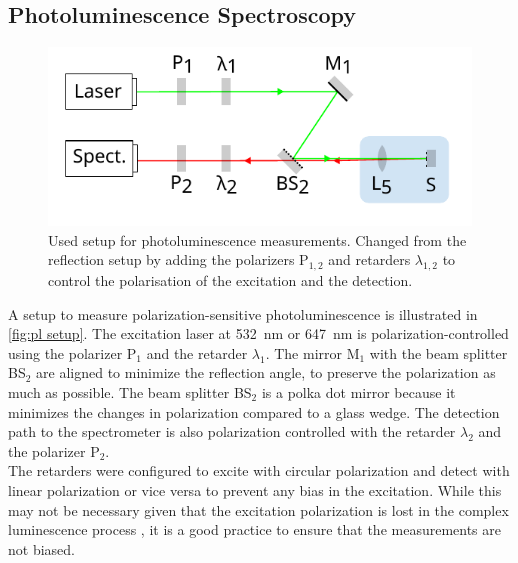 \documentclass[
	twoside,
	parskip=half,
	a4paper,
]{scrbook}
\begin{document}
\subsection{Photoluminescence Spectroscopy}
\begin{figure}
	\centering
	\includegraphics{../figures/setup_simplified.pdf}
	\caption{Used setup for photoluminescence measurements. 
	Changed from the reflection setup by adding the polarizers P$_{1,2}$ and retarders $\lambda_{1,2}$ to control the polarisation of the excitation and the detection.}
	\label{fig:pl setup}
\end{figure}
A setup to measure polarization-sensitive photoluminescence is illustrated in \autoref{fig:pl setup}.
The excitation laser at \SI{532}{nm} or \SI{647}{nm} is polarization-controlled using the polarizer P$_1$ and the retarder $\lambda_1$.
The mirror M$_1$ with the beam splitter BS$_2$ are aligned to minimize the reflection angle, to preserve the polarization as much as possible.
The beam splitter BS$_2$ is a polka dot mirror because it minimizes the changes in polarization compared to a glass wedge.
The detection path to the spectrometer is also polarization controlled with the retarder $\lambda_2$ and the polarizer P$_2$.\\
The retarders were configured to excite with circular polarization and detect with linear polarization or vice versa to prevent any bias in the excitation.
While this may not be necessary given that the excitation polarization is lost in the complex luminescence process \cite{NiPS3_linear}, it is a good practice to ensure that the measurements are not biased.
\end{document}
